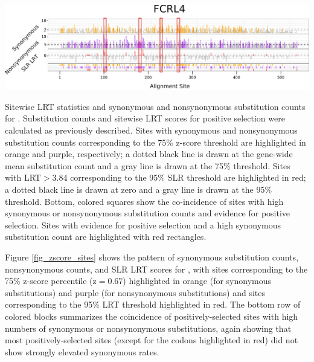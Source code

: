 \bbfig
\centering
\includegraphics[scale=0.7]{Figs/zscore_sites.pdf}
\caption{Sitewise LRT statistics and synonymous and nonsynonymous
  substitution counts for . Substitution counts and
  sitewise LRT scores for positive selection were calculated as
  previously described. Sites with synonymous and nonsynonymous
  substitution counts corresponding to the 75\% z-score threshold are
  highlighted in orange and purple, respectively; a dotted black line
  is drawn at the gene-wide mean substitution count and a gray line is
  drawn at the 75\% threshold. Sites with LRT$>3.84$ corresponding to
  the 95\% SLR threshold are highlighted in red; a dotted black line
  is drawn at zero and a gray line is drawn at the 95\%
  threshold. Bottom, colored squares show the co-incidence of sites
  with high synonymous or nonsynonymous substitution counts and
  evidence for positive selection. Sites with evidence for positive
  selection and a high synonymous substitution count are highlighted
  with red rectangles.}
\label{fig_zscore_sites}
\eefig

Figure \ref{fig_zscore_sites} shows the pattern of synonymous
substitution counts, nonsynonymous counts, and SLR LRT scores for
, with sites corresponding to the 75\% z-score percentile
(z$=0.67$) highlighted in orange (for synonymous substitutions) and
purple (for nonsynonymous substitutions) and sites corresponding to
the 95\% LRT threshold highlighted in red. The bottom row of colored
blocks summarizes the coincidence of positively-selected sites with
high numbers of synonymous or nonsynonymous substitutions, again
showing that most positively-selected sites (except for the codons
highlighted in red) did not show strongly elevated synonymous rates.


